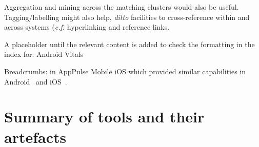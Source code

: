 Aggregation and mining across the matching clusters would also be useful. Tagging/labelling might also help, \emph{ditto} facilities to cross-reference within and across systems (\emph{c.f.} hyperlinking and reference links.

A placeholder until the relevant content is added to check the formatting in the index for: Android Vitals

Breadcrumbs: in AppPulse Mobile iOS which provided similar capabilities in Android~ and iOS~.

\section{Summary of tools and their artefacts}~\label{tata-summary-section}
